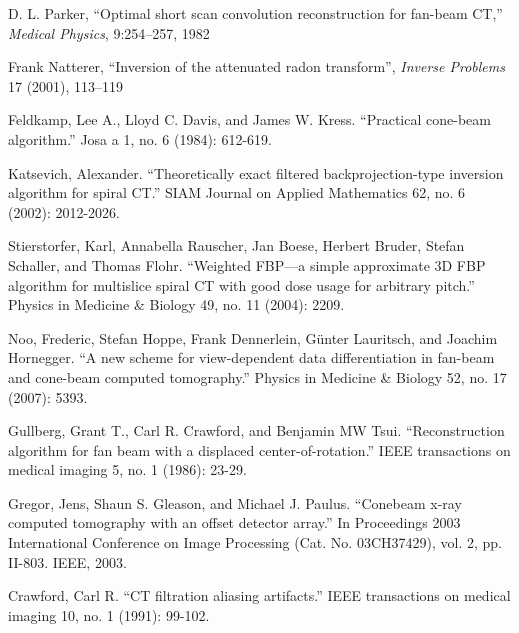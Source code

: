 \documentclass[11pt]{article}
\begin{document}
\begin{thebibliography}{100}
 D. L. Parker, ``Optimal short scan convolution reconstruction for fan-beam CT,'' \emph{Medical Physics}, 9:254–257, 
1982

 Frank Natterer, ``Inversion of the attenuated radon transform'', \emph{Inverse Problems} 17 (2001), 113–119

 Feldkamp, Lee A., Lloyd C. Davis, and James W. Kress. ``Practical cone-beam algorithm.'' Josa a 1, no. 6 (1984): 612-619.

 Katsevich, Alexander. ``Theoretically exact filtered backprojection-type inversion algorithm for spiral CT.'' SIAM Journal on Applied Mathematics 62, no. 6 (2002): 2012-2026.

 Stierstorfer, Karl, Annabella Rauscher, Jan Boese, Herbert Bruder, Stefan Schaller, and Thomas Flohr. ``Weighted FBP—a simple approximate 3D FBP algorithm for multislice spiral CT with good dose usage for arbitrary pitch.'' Physics in Medicine \& Biology 49, no. 11 (2004): 2209.

 Noo, Frederic, Stefan Hoppe, Frank Dennerlein, Günter Lauritsch, and Joachim Hornegger. ``A new scheme for view-dependent data differentiation in fan-beam and cone-beam computed tomography.'' Physics in Medicine \& Biology 52, no. 17 (2007): 5393.

 Gullberg, Grant T., Carl R. Crawford, and Benjamin MW Tsui. ``Reconstruction algorithm for fan beam with a displaced center-of-rotation.'' IEEE transactions on medical imaging 5, no. 1 (1986): 23-29.

 Gregor, Jens, Shaun S. Gleason, and Michael J. Paulus. ``Conebeam x-ray computed tomography with an offset detector array.'' In Proceedings 2003 International Conference on Image Processing (Cat. No. 03CH37429), vol. 2, pp. II-803. IEEE, 2003.

 Crawford, Carl R. ``CT filtration aliasing artifacts.'' IEEE transactions on medical imaging 10, no. 1 (1991): 99-102.

\end{thebibliography}
\end{document}
